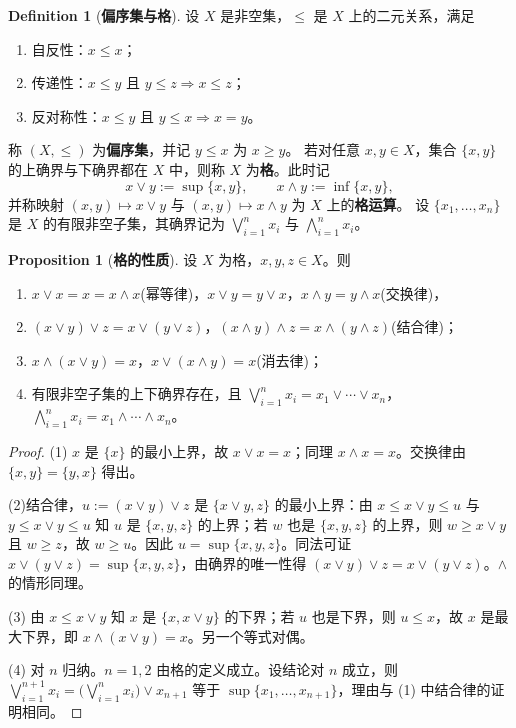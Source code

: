 \documentclass[oneside]{book}
\theoremstyle{definition}
\theoremstyle{definition}
\newtheorem{proposition}{Proposition}[section]
\newtheorem{definition}{Definition}[section]
\begin{document}
	\begin{definition}[\bfseries{偏序集与格}]
		设 $X$ 是非空集，$\leqslant$ 是 $X$ 上的二元关系，满足
		\begin{enumerate}[label=(\roman*),leftmargin=2.2em,itemsep=0.1em,topsep=0.3em]
			\item 自反性：$x\leqslant x$；
			\item 传递性：$x\leqslant y$ 且 $y\leqslant z \Rightarrow x\leqslant z$；
			\item 反对称性：$x\leqslant y$ 且 $y\leqslant x \Rightarrow x=y$。
		\end{enumerate}
		称 $(X,\leqslant)$ 为\textbf{偏序集}，并记 $y\leqslant x$ 为 $x\geqslant y$。
		若对任意 $x,y\in X$，集合 $\{x,y\}$  的上确界与下确界都在 $X$ 中，则称 $X$ 为\textbf{格}。此时记
		\[
		x\vee y:=\sup\{x,y\},\qquad x\wedge y:=\inf\{x,y\},
		\]
		并称映射 $(x,y)\mapsto x\vee y$ 与 $(x,y)\mapsto x\wedge y$ 为 $X$ 上的\textbf{格运算}。
		设 $\{x_{1},\dots,x_{n}\}$ 是 $X$ 的有限非空子集，其确界记为 $\bigvee_{i=1}^{n}x_{i}$ 与 $\bigwedge_{i=1}^{n}x_{i}$。
	\end{definition}
	
	\begin{proposition}[\bfseries{格的性质}]
		设 $X$ 为格，$x,y,z\in X$。则
		\begin{enumerate}[label=(\arabic*),leftmargin=2.2em,itemsep=0.1em,topsep=0.3em]
			\item $x\vee x=x=x\wedge x$(幂等律)，$x\vee y=y\vee x$，$x\wedge y=y\wedge x$(交换律)，
			\item $(x\vee y)\vee z=x\vee(y\vee z)$，$(x\wedge y)\wedge z=x\wedge(y\wedge z)$(结合律)；
			\item $x\wedge(x\vee y)=x$，$x\vee(x\wedge y)=x$(消去律)；
			\item 有限非空子集的上下确界存在，且
			$\bigvee_{i=1}^{n}x_{i}=x_{1}\vee\cdots\vee x_{n}$，$\bigwedge_{i=1}^{n}x_{i}=x_{1}\wedge\cdots\wedge x_{n}$。
		\end{enumerate}
	\end{proposition}
	
	\begin{proof}
		(1) $x$ 是 $\{x\}$ 的最小上界，故 $x\vee x=x$；同理 $x\wedge x=x$。交换律由 $\{x,y\}=\{y,x\}$ 得出。
		
		(2)结合律，$u:=(x\vee y)\vee z$ 是 $\{x\vee y,z\}$ 的最小上界：由 $x\leqslant x\vee y\leqslant u$ 与 $y\leqslant x\vee y\leqslant u$ 知 $u$ 是 $\{x,y,z\}$ 的上界；若 $w$ 也是 $\{x,y,z\}$ 的上界，则 $w\geqslant x\vee y$ 且 $w\geqslant z$，故 $w\geqslant u$。因此 $u=\sup\{x,y,z\}$。同法可证 $x\vee(y\vee z)=\sup\{x,y,z\}$，由确界的唯一性得 $(x\vee y)\vee z=x\vee(y\vee z)$。$\wedge$ 的情形同理。
		
		(3) 由 $x\leqslant x\vee y$ 知 $x$ 是 $\{x,x\vee y\}$ 的下界；若 $u$ 也是下界，则 $u\leqslant x$，故 $x$ 是最大下界，即 $x\wedge(x\vee y)=x$。另一个等式对偶。
		
		(4) 对 $n$ 归纳。$n=1,2$ 由格的定义成立。设结论对 $n$ 成立，则 $\bigvee_{i=1}^{n+1}x_{i}=\Big(\bigvee_{i=1}^{n}x_{i}\Big)\vee x_{n+1}$ 等于 $\sup\{x_{1},\dots,x_{n+1}\}$，理由与 (1) 中结合律的证明相同。
	\end{proof}
	
\end{document}

